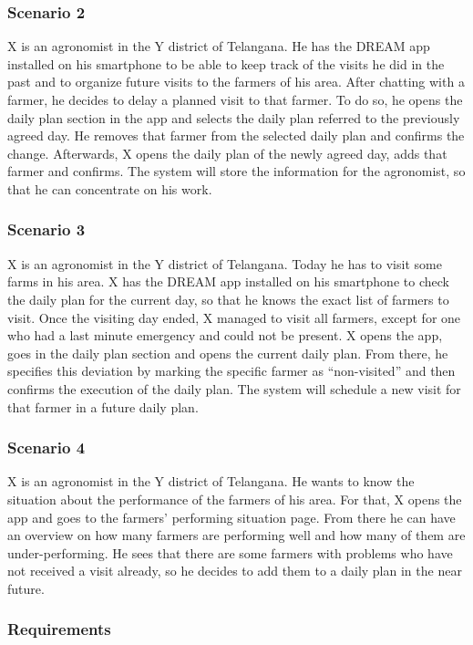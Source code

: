 \subsubsection*{Scenario 2}
X is an agronomist in the Y district of Telangana. He has the DREAM app installed on his smartphone to be able to keep track of the visits he did in the past and to organize future visits to the farmers of his area. After chatting with a farmer, he decides to delay a planned visit to that farmer. To do so, he opens the daily plan section in the app and selects the daily plan referred to the previously agreed day. He removes that farmer from the selected daily plan and confirms the change. Afterwards, X opens the daily plan of the newly agreed day, adds that farmer and confirms. The system will store the information for the agronomist, so that he can concentrate on his work.



\subsubsection*{Scenario 3}
X is an agronomist in the Y district of Telangana. Today he has to visit some farms in his area. X has the DREAM app installed on his smartphone to check the daily plan for the current day, so that he knows the exact list of farmers to visit. Once the visiting day ended, X managed to visit all farmers, except for one who had a last minute emergency and could not be present. X opens the app, goes in the daily plan section and opens the current daily plan. From there, he specifies this deviation by marking the specific farmer as “non-visited” and then confirms the execution of the daily plan. The system will schedule a new visit for that farmer in a future daily plan.

\subsubsection*{Scenario 4}
X is an agronomist in the Y district of Telangana. He wants to know the situation about the performance of the farmers of his area. For that, X opens the app and goes to the farmers’ performing situation page. From there he can have an overview on how many farmers are performing well and how many of them are under-performing. He sees that there are some farmers with problems who have not received a visit already, so he decides to add them to a daily plan in the near future.

\subsubsection{Requirements}
